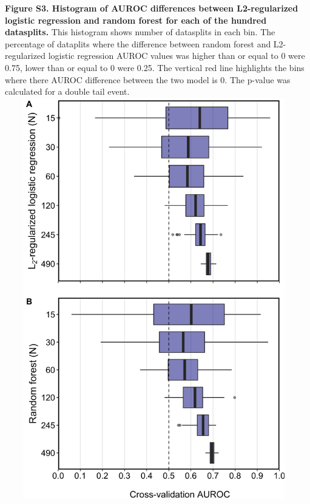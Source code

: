 \documentclass[11pt,]{article}
\begin{document}
\textbf{Figure S3. Histogram of AUROC differences between L2-regularized
logistic regression and random forest for each of the hundred
datasplits.} This histogram shows number of datasplits in each bin. The
percentage of dataplits where the difference between random forest and
L2-regularized logistic regression AUROC values was higher than or equal
to 0 were 0.75, lower than or equal to 0 were 0.25. The vertical red
line highlights the bins where there AUROC difference between the two
model is 0. The p-value was calculated for a double tail event. \newpage
\includegraphics[height=17.5cm, width=13cm]{Figure_S4.png}
\end{document}
